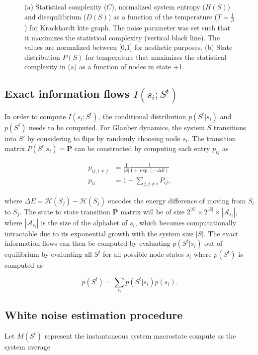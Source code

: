 \documentclass[a4paper, 11pt, twocolumn]{article}
\newcommand{\m}[1]{\textbf{#1}}
\newcommand{\infdecay}{I(s_i : S^t)}
\begin{document}
\begin{figure}[htbp]
\caption{\label{fig:stat_compl}(a) Statistical complexity ($C$), normalized system entropy ($H(S)$) and disequilibrium ($D(S)$) as a function of the temperature ($T = \frac{1}{\beta}$) for Krackhardt kite graph. The noise parameter was set such that it maximizes the statistical complexity (vertical black line). The values are normalized between [0,1] for aesthetic purposes. (b) State distribution $P(S)$ for temperature that maximizes the statistical complexity in (a) as a function of nodes in state +1.}
\end{figure}

\subsection{Exact information flows $I(s_i ; S^t)$}
\label{sec:org59af222}
In   order   to   compute   $\infdecay$,   the   conditional
distribution  $p(S^t  |  s_i)$  and  $p(S^t)$  needs  to  be
computed. For  Glauber dynamics, the system  $S$ transitions
into $S'$ by considering to  flips by randomly choosing node $s_i$. The  transition matrix $P(S^t |  s_i) = \m P$  can be
constructed by computing each entry $p_{ij}$ as

\begin{equation}
\label{eq:glauber}
\begin{split}
p_{ij, i \neq j} &= \frac{1}{|S|} \frac{1}{ 1 + \exp (-\Delta E) }\\
p_{ii} &= 1 - \sum_{j, j \neq i} P_{ij},
\end{split}
\end{equation}

where $\Delta E =  \mathcal{H}(S_j) - \mathcal{H}(S_j)$ encodes the
energy difference of  moving from $S_i$ to  $S_j$. The state
to state transition $\m P$ matrix will be of size $2^{|S|} \times
2^{|S|} \times |\mathcal{A}_{s_i}|$, where $|\mathcal{A}_{s_i}|$ is the size of
the alphabet of $s_i$, which becomes computationally intractable due
to its  exponential growth with  the system size  $|S|$. The
exact information  flows can then be  computed by evaluating
$p(S^t |  s_i)$ out of  equilibrium by evaluating  all $S^t$
for  all  possible  node  states  $s_i$  where  $p(S^t)$  is
computed as

\begin{equation}
p(S^t) = \sum_{s_i} p(S^t | s_i ) p(s_i).
\end{equation}

\subsection{White noise estimation procedure}
\label{sec:orgc093508}
Let $M(S^t)$  represent the instantaneous  system macrostate
compute as the system average
\end{document}
